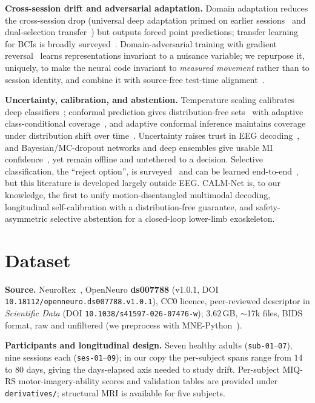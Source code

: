 \documentclass[conference]{IEEEtran}
\begin{document}
\textbf{Cross-session drift and adversarial adaptation.} Domain adaptation reduces
the cross-session drop (universal deep adaptation primed on earlier
sessions~\cite{zhang2023} and dual-selection transfer~\cite{luo2023}) but outputs
forced point predictions; transfer learning for BCIs is broadly
surveyed~\cite{jayaram2016}. Domain-adversarial training with gradient
reversal~\cite{ganin2016} learns representations invariant to a nuisance variable; we
repurpose it, uniquely, to make the neural code invariant to \emph{measured movement}
rather than to session identity, and combine it with source-free test-time
alignment~\cite{sun2016}.

\textbf{Uncertainty, calibration, and abstention.} Temperature scaling calibrates
deep classifiers~\cite{guo2017}; conformal prediction gives distribution-free
sets~\cite{vovk2005, angelopoulos2023} with adaptive class-conditional
coverage~\cite{romano2020}, and adaptive conformal inference maintains coverage
under distribution shift over time~\cite{gibbs2021}. Uncertainty raises trust in EEG
decoding~\cite{tveter2024}, and Bayesian/MC-dropout networks and deep ensembles give
usable MI confidence~\cite{milanes2023,gal2016,lakshminarayanan2017}, yet remain
offline and untethered to a decision. Selective classification, the ``reject
option'', is surveyed~\cite{hendrickx2024} and can be learned
end-to-end~\cite{geifman2017, geifman2019}, but
this literature is developed largely outside EEG. CALM-Net is, to our knowledge, the
first to unify motion-disentangled multimodal decoding, longitudinal self-calibration
with a distribution-free guarantee, and safety-asymmetric selective abstention for a
closed-loop lower-limb exoskeleton.

\section{Dataset}\label{sec:data}
\textbf{Source.} NeuroRex~\cite{sarkar2026}, OpenNeuro \textbf{ds007788} (v1.0.1, DOI
\texttt{10.18112/openneuro.ds007788.v1.0.1}), CC0 licence, peer-reviewed descriptor
in \emph{Scientific Data} (DOI \texttt{10.1038/s41597-026-07476-w}); $3.62$\,GB,
$\sim$17k files, BIDS format, raw and unfiltered (we preprocess with
MNE-Python~\cite{gramfort2014}).

\textbf{Participants and longitudinal design.} Seven healthy adults
(\texttt{sub-01}--\texttt{07}), nine sessions each (\texttt{ses-01}--\texttt{09}); in
our copy the per-subject spans range from $14$ to $80$ days, giving the days-elapsed
axis needed to study drift. Per-subject MIQ-RS motor-imagery-ability scores and
validation tables are provided under \texttt{derivatives/}; structural MRI is
available for five subjects.
\end{document}
